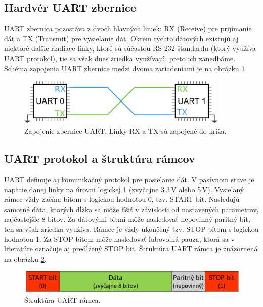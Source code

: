 \subsection{Hardvér UART zbernice}
UART zbernica pozostáva z dvoch hlavných liniek: RX (Receive) pre prijímanie dát a TX (Transmit) pre vysielanie dát. Okrem týchto dátových existujú aj niektoré ďalšie riadiace linky, ktoré sú súčasťou RS-232 štandardu \cite{rs232Spec} (ktorý využíva UART protokol), tie sa však dnes zriedka využívajú, preto ich zanedbáme. Schéma zapojenia UART zbernice medzi dvoma zariadeniami je na obrázku \ref{obr:uartWiring}.

\begin{figure}
    \centerline{\includegraphics[width=0.9\textwidth]{images/uartWiring.png}}
    \caption[Zapojenie zbernice UART]{Zapojenie zbernice UART. Linky RX a TX sú zapojené do kríža.}
    \label{obr:uartWiring}
\end{figure}

\subsection{UART protokol a štruktúra rámcov}
UART definuje aj komunikačný protokol pre posielanie dát. V pasívnom stave je napätie danej linky na úrovni logickej 1 (zvyčajne 3.3\,V alebo 5\,V). Vysielaný rámec vždy začína bitom s logickou hodnotou 0, tzv. START bit. Nasledujú samotné dáta, ktorých dĺžka sa môže líšiť v závislosti od nastavených parametrov, najčastejšie 8 bitov. Za dátovými bitmi môže nasledovať nepovinný paritný bit, ten sa však zriedka využíva. Rámec je vždy ukončený tzv. STOP bitom s logickou hodnotou 1. Za STOP bitom môže nasledovať ľubovoľná pauza, ktorá sa v literatúre označuje aj predĺžený STOP bit. Štruktúra UART rámca je znázornená na obrázku \ref{obr:uartFrame}.

\begin{figure}
    \centerline{\includegraphics[width=1\textwidth]{images/uartFrame.png}}
    \caption[Štruktúra UART rámca]{Štruktúra UART rámca.}
    \label{obr:uartFrame}
\end{figure}

